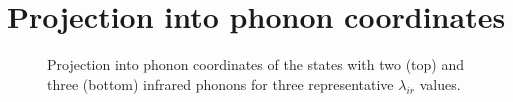 \section{Projection into phonon coordinates}
\label{sec:irPhononProj}

\begin{figure}[ht]
  \centering
  
  \caption[Projection into phonon coordinates of the states with two and three infrared phonons.]
  {Projection into phonon coordinates of the states with two (top) and three (bottom) infrared phonons for three representative $\lambda_{ir}$ values.}
  \label{fig:phononProj2-3ir}
\end{figure}
